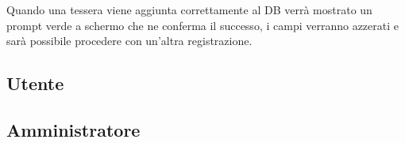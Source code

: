 \documentclass[a4paper,12pt]{report}
\begin{document}
Quando una tessera viene aggiunta correttamente al DB verrà mostrato un prompt verde a schermo che ne conferma il successo, i campi verranno azzerati e sarà possibile procedere con un'altra registrazione.
\subsection{Utente}
\subsection{Amministratore}
\end{document}
